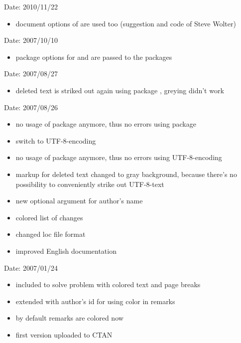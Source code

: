 
Date: 2010/11/22
\begin{itemize}
	\item document options of  are used too (suggestion and code of Steve Wolter)
\end{itemize}


Date: 2007/10/10
\begin{itemize}
	\item package options for  and  are passed to the packages
\end{itemize}


Date: 2007/08/27
\begin{itemize}
	\item deleted text is striked out again using package , greying didn't work
\end{itemize}


Date: 2007/08/26
\begin{itemize}
	\item no usage of package  anymore, thus no errors using package 
	\item switch to UTF-8-encoding
	\item no usage of package  anymore, thus no errors using UTF-8-encoding
	\item markup for deleted text changed to gray background, because there's no possibility to conveniently strike out UTF-8-text
	\item new optional argument for author's name
	\item colored list of changes
	\item changed loc file format
	\item improved English documentation
\end{itemize}


Date: 2007/01/24
\begin{itemize}
	\item included  to solve problem with colored text and page breaks
	\item extended  with author's id for using color in remarks
	\item by default remarks are colored now
	\item first version uploaded to CTAN
\end{itemize}

